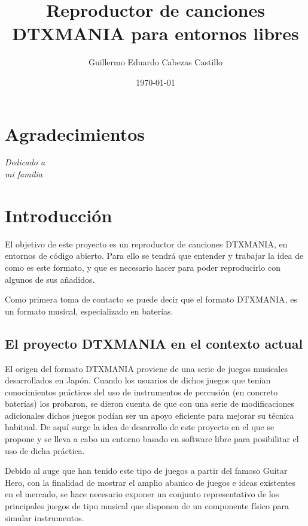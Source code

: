 \documentclass[a4paper,11pt,oneside]{book}
\begin{document}
 
\title{Reproductor de canciones DTXMANIA para entornos libres}
\author{Guillermo Eduardo Cabezas Castillo}
\date{\today}

\maketitle 

\tableofcontents
\listoffigures
\chapter*{Agradecimientos}
\begin{flushright}
\textit{Dedicado a \\
mi familia}
\end{flushright}

\chapter{Introducción}

	 El objetivo de este proyecto es un reproductor de canciones DTXMANIA, en entornos de código abierto. Para ello se tendrá que entender y trabajar la idea de como es este formato, y que es necesario hacer para poder reproducirlo con algunos de sus añadidos.


\par
  Como primera toma de contacto se puede decir que el formato DTXMANIA, es un formato musical, especializado en baterías.

\section{El proyecto DTXMANIA en el contexto actual}
  
  El origen del formato DTXMANIA proviene de una serie de juegos musicales desarrollados en Japón. Cuando los usuarios de dichos juegos que tenían conocimientos prácticos del uso de instrumentos de percusión (en concreto baterías) los probaron, se dieron cuenta de que con una serie de modificaciones adicionales dichos juegos podían ser un apoyo eficiente para mejorar su técnica habitual. De aquí surge la idea de desarrollo de este proyecto en el que se propone y se lleva a cabo un entorno basado en software libre para posibilitar el uso de dicha práctica.
  
  Debido al auge que han tenido este tipo de juegos a partir del famoso \gls{Guitar Hero}, con la finalidad de mostrar el amplio abanico de juegos e ideas existentes en el mercado, se hace necesario exponer un conjunto representativo de los principales juegos de tipo musical que disponen de un componente físico para simular instrumentos.
  
\end{document}
